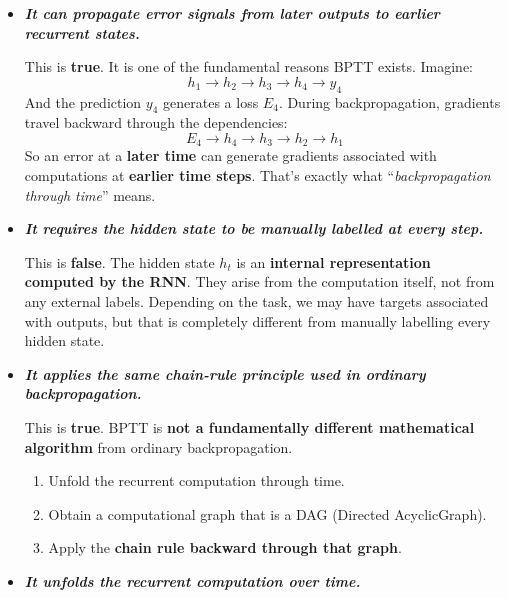 \begin{itemize}
    \item[\textcolor{Green3}{\faIcon{check}}] \textcolor{Green3}{\textbf{\emph{It can propagate error signals from later outputs to earlier recurrent states.}}}

        This is \textbf{true}. It is one of the fundamental reasons BPTT exists. Imagine:
        \begin{equation*}
            h_1 \to h_2 \to h_3 \to h_4 \to y_4
        \end{equation*}
        And the prediction $y_4$ generates a loss $E_4$. During backpropagation, gradients travel backward through the dependencies:
        \begin{equation*}
            E_4 \to h_4 \to h_3 \to h_2 \to h_1
        \end{equation*}
        So an error at a \textbf{later time} can generate gradients associated with computations at \textbf{earlier time steps}. That's exactly what ``\emph{backpropagation through time}'' means.

    \item[\textcolor{Red2}{\faIcon{times}}] \textcolor{Red2}{\textbf{\emph{It requires the hidden state to be manually labelled at every step.}}}

        This is \textbf{false}. The hidden state $h_t$ is an \textbf{internal representation computed by the RNN}. They arise from the computation itself, not from any external labels. Depending on the task, we may have targets associated with outputs, but that is completely different from manually labelling every hidden state.

    \item[\textcolor{Green3}{\faIcon{check}}] \textcolor{Green3}{\textbf{\emph{It applies the same chain-rule principle used in ordinary backpropagation.}}}

        This is \textbf{true}. BPTT is \textbf{not a fundamentally different mathematical algorithm} from ordinary backpropagation.
        \begin{enumerate}
            \item Unfold the recurrent computation through time.
            \item Obtain a computational graph that is a DAG (Directed Acyclic\break Graph).
            \item Apply the \textbf{chain rule backward through that graph}.
        \end{enumerate}

    \item[\textcolor{Green3}{\faIcon{check}}] \textcolor{Green3}{\textbf{\emph{It unfolds the recurrent computation over time.}}}


\end{itemize}

